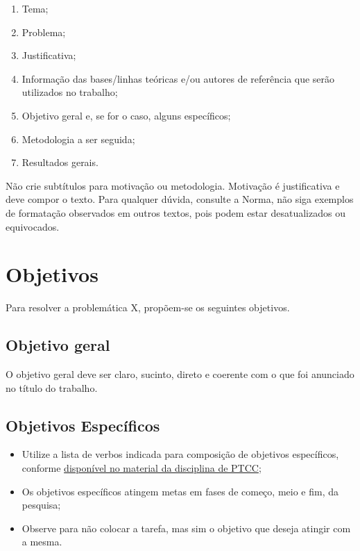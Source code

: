 \documentclass[
	12pt,				%
	oneside,			%
	a4paper,			%
	chapter=TITLE,		%
	section=TITLE,		%
	english,			%
	brazil,				%
	]{abntex2}
\begin{document}
\begin{enumerate}[label=\alph*)]
    \item Tema;
    \item Problema;
    \item Justificativa;
    \item Informação das bases/linhas teóricas e/ou autores de referência que serão utilizados no trabalho;
    \item Objetivo geral e, se for o caso, alguns específicos;
    \item Metodologia a ser seguida;
    \item Resultados gerais.
\end{enumerate}

Não crie subtítulos para motivação ou metodologia.
Motivação é justificativa e deve compor o texto.
Para qualquer dúvida, consulte a Norma, não siga exemplos de formatação observados em outros textos, pois podem estar desatualizados ou equivocados.

\section{Objetivos}

Para resolver a problemática X, propõem-se os seguintes objetivos.

\subsection{Objetivo geral}

O objetivo geral deve ser claro, sucinto, direto e coerente com o que foi anunciado no título do trabalho.

\subsection{Objetivos Específicos}

\begin{itemize}
    \item Utilize a lista de verbos indicada para composição de objetivos específicos, conforme  \href{https://www.youtube.com/watch?v=Ycl5a-5gR4w}{disponível no material da disciplina de PTCC};
    \item Os objetivos específicos atingem metas em fases de começo, meio e fim, da pesquisa;
    \item Observe para não colocar a tarefa, mas sim o objetivo que deseja atingir com a mesma.
\end{itemize}
\end{document}
